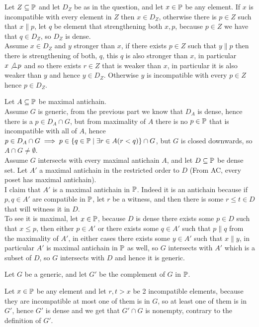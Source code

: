 \begin{cExercise}[][][author][2]
	\begin{cPart}
		Let $Z\subseteq\P$ and let $D_Z$ be as in the question, and let $x\in\P$ be any element.
		If $x$ is incompatible with every element in $Z$ then $x\in D_Z$, otherwise there is $p\in Z$ such that $x\| p$, let $q$ be element that strengthening both $x,p$, because $p\in Z$ we have that $q\in D_Z$, so $D_Z$ is dense.\\
		Assume $x\in D_Z$ and $y$ stronger than $x$, if there exists $p\in Z$ such that $y\|p$ then there is strengthening of both, $q$, this $q$ is also stronger than $x$, in particular $x\not\bot p$ and so there exists $r\in Z$ that is weaker than $x$, in particular it is also weaker than $y$ and hence $y\in D_Z$. Otherwise $y$ is incompatible with every $p\in Z$ hence $p\in D_Z$.
	\end{cPart}
	\begin{cPart}
		Let $A\subseteq \P$ be maximal antichain. \\
		Assume $G$ is generic, from the previous part we know that $D_A$ is dense, hence there is a $p\in D_A\cap G$, but from maximality of $A$ there is no $p\in \P$ that is incompatible with all of $A$, hence $p\in D_A\cap G\implies p\in\{q\in \P\mid \exists r\in A(r<q)\}\cap G$, but $G$ is closed downwards, so $A\cap G\ne\emptyset$.\\
		Assume $G$ intersects with every maximal antichain $A$, and let $D\subseteq\P$ be dense set. Let $A'$ a maximal antichain in the restricted order to $D$ (From AC, every poset has maximal antichain).\\
		I claim that $A'$ is a maximal antichain in $\P$. Indeed it is an antichain because if $p,q\in A'$ are compatible in $\P$, let $r$ be a witness, and then there is some $r\le t\in D$ that will witness it in $D$. \\
		To see it is maximal, let $x\in \P$, because $D$ is dense there exists some $p\in D$ such that $x\le p$, then either $p\in A'$ or there exists some $q\in A'$ such that $p\|q$ from the maximality of $A'$, in either cases there exists some $y\in A'$ such that $x\|y$, in particular $A'$ is maximal antichain in $\P$ as well, so $G$ intersects with $A'$ which is a subset of $D$, so $G$ intersects with $D$ and hence it is generic.
	\end{cPart}
\end{cExercise}
\begin{cExercise}
	Let $G$ be a generic, and let $G'$ be the complement of $G$ in $\P$.
	
	Let $x\in \P$ be any element and let $r,t>x$ be 2 incompatible elements, because they are incompatible at most one of them is in $G$, so at least one of them is in $G'$, hence $G'$ is dense and we get that $G'\cap G$ is nonempty, contrary to the definition of $G'$. 
\end{cExercise}
